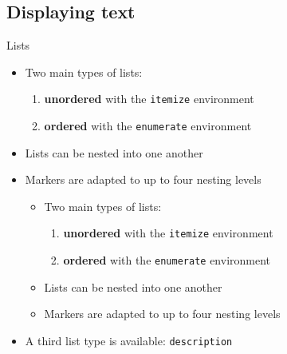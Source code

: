 \subsection{Displaying text}

\begin{frame}[fragile]{Lists}
	\begin{itemize}
		\item Two main types of lists:
		\begin{enumerate}
			\item \textbf{unordered} with the \texttt{itemize} environment
			\item \textbf{ordered} with the \texttt{enumerate} environment
		\end{enumerate}
		\item Lists can be nested into one another
		\item Markers are adapted to up to four nesting levels

		\pause
\begin{codesource}
	\begin{itemize}
		\item Two main types of lists:
		\begin{enumerate}
			\item \textbf{unordered} with the \verb=itemize= environment
			\item \textbf{ordered} with the \verb=enumerate= environment
		\end{enumerate}
		\item Lists can be nested into one another
		\item Markers are adapted to up to four nesting levels
	\end{itemize}
\end{codesource}

		\pause
		\item A third list type is available: \texttt{description}
	\end{itemize}
\end{frame}

